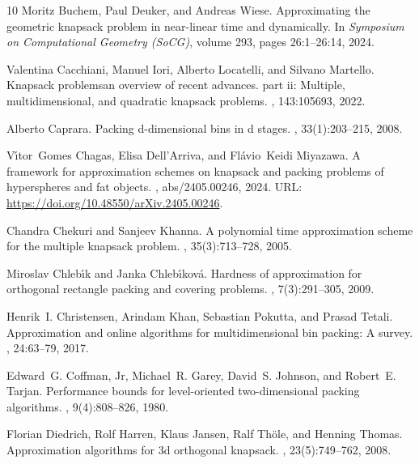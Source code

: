 \documentclass[10pt,a4paper]{amsart}
\theoremstyle{definition}
\begin{document}
\begin{thebibliography}{10}
Moritz Buchem, Paul Deuker, and Andreas Wiese.
\newblock Approximating the geometric knapsack problem in near-linear time and
  dynamically.
\newblock In {\em Symposium on Computational Geometry (SoCG)}, volume 293,
  pages 26:1--26:14, 2024.

Valentina Cacchiani, Manuel Iori, Alberto Locatelli, and Silvano Martello.
\newblock Knapsack problems\textemdash{}an overview of recent advances. part ii:
  Multiple, multidimensional, and quadratic knapsack problems.
, 143:105693, 2022.

Alberto Caprara.
\newblock Packing d-dimensional bins in d stages.
, 33(1):203--215, 2008.

V{\'{\i}}tor~Gomes Chagas, Elisa Dell'Arriva, and Fl{\'{a}}vio~Keidi Miyazawa.
\newblock A framework for approximation schemes on knapsack and packing
  problems of hyperspheres and fat objects.
, abs/2405.00246, 2024.
\newblock URL: \url{https://doi.org/10.48550/arXiv.2405.00246}.

Chandra Chekuri and Sanjeev Khanna.
\newblock A polynomial time approximation scheme for the multiple knapsack
  problem.
, 35(3):713--728, 2005.

Miroslav Chleb{\'{\i}}k and Janka Chleb{\'{\i}}kov{\'{a}}.
\newblock Hardness of approximation for orthogonal rectangle packing and
  covering problems.
, 7(3):291--305, 2009.

Henrik~I. Christensen, Arindam Khan, Sebastian Pokutta, and Prasad Tetali.
\newblock Approximation and online algorithms for multidimensional bin packing:
  A survey.
, 24:63--79, 2017.

Edward~G. Coffman, Jr, Michael~R. Garey, David~S. Johnson, and Robert~E.
  Tarjan.
\newblock Performance bounds for level-oriented two-dimensional packing
  algorithms.
, 9(4):808--826, 1980.

Florian Diedrich, Rolf Harren, Klaus Jansen, Ralf Th{\"{o}}le, and Henning
  Thomas.
\newblock Approximation algorithms for 3d orthogonal knapsack.
, 23(5):749--762,
  2008.


\end{thebibliography}
\end{document}
